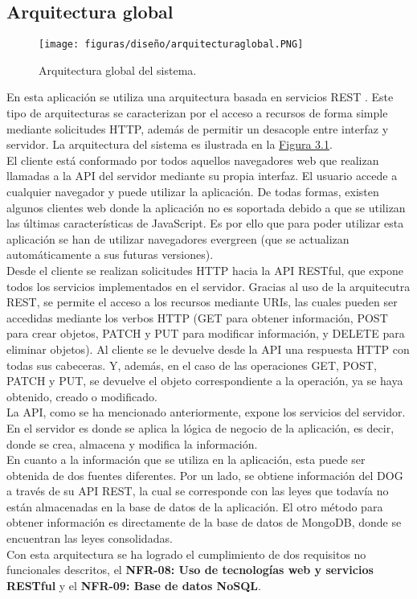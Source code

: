 \subsection{Arquitectura global}

\begin{figure}[H]
\centerline{\texttt{[image: figuras/diseño/arquitecturaglobal.PNG]}}
\caption{Arquitectura global del sistema.}
\label{enlaceArquitecturaGlobal}
\end{figure}

En esta aplicación se utiliza una arquitectura basada en servicios REST \cite{rest}. Este tipo de arquitecturas se caracterizan por el acceso a recursos de forma simple mediante solicitudes HTTP, además de permitir un desacople entre interfaz y servidor. La arquitectura del sistema es ilustrada en la \hyperref[enlaceArquitecturaGlobal]{Figura 3.1}.
\\

El cliente está conformado por todos aquellos navegadores web que realizan llamadas a la API del servidor mediante su propia interfaz. El usuario accede a cualquier navegador y puede utilizar la aplicación. De todas formas, existen algunos clientes web donde la aplicación no es soportada debido a que se utilizan las últimas características de JavaScript. Es por ello que para poder utilizar esta aplicación se han de utilizar navegadores evergreen \cite{evergreen} (que se actualizan automáticamente a sus futuras versiones).
\\

Desde el cliente se realizan solicitudes HTTP hacia la API RESTful, que expone todos los servicios implementados en el servidor. Gracias al uso de la arquitecutra REST, se permite el acceso a los recursos mediante URIs, las cuales pueden ser accedidas mediante los verbos HTTP (GET para obtener información, POST para crear objetos, PATCH y PUT para modificar información, y DELETE para eliminar objetos). Al cliente se le devuelve desde la API una respuesta HTTP con todas sus cabeceras. Y, además, en el caso de las operaciones GET, POST, PATCH y PUT, se devuelve el objeto correspondiente a la operación, ya se haya obtenido, creado o modificado.
\\

La API, como se ha mencionado anteriormente, expone los servicios del servidor. En el servidor es donde se aplica la lógica de negocio \cite{logicanegocio} de la aplicación, es decir, donde se crea, almacena y modifica la información.
\\

En cuanto a la información que se utiliza en la aplicación, esta puede ser obtenida de dos fuentes diferentes. Por un lado, se obtiene información del DOG a través de su API REST, la cual se corresponde con las leyes que todavía no están almacenadas en la base de datos de la aplicación. El otro método para obtener información es directamente de la base de datos de MongoDB, donde se encuentran las leyes consolidadas.
\\

Con esta arquitectura se ha logrado el cumplimiento de dos requisitos no funcionales descritos, el {\bf NFR-08: Uso de tecnologías web y servicios RESTful} y el {\bf NFR-09: Base de datos NoSQL}.